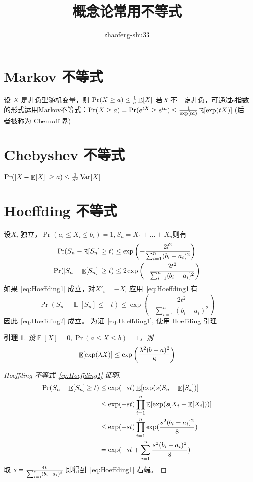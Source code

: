 \documentclass{article}
\DeclareMathOperator\E{\mathbb{E}}
\DeclareMathOperator\Var{\mathrm{Var}}
\newtheorem{lemma}{引理}
\theoremstyle{definition}
\DeclarePairedDelimiter\abs{\lvert}{\rvert}
\begin{document}
\title{概念论常用不等式}
\author{zhaofeng-shu33}
\maketitle
\section{Markov 不等式}
设 $X$ 是非负型随机变量，则 $\Pr(X\geq a) \leq {1 \over a} \E[X]$
若$X$ 不一定非负，可通过$e$指数的形式运用Markov不等式：$\Pr(X\geq a) = \Pr(e^{tX} \geq e^{ta}) \leq { 1 \over \exp(ta)} \E[\exp(tX)]$
(后者被称为 Chernoff 界)

\section{Chebyshev 不等式}
$\Pr(\abs{X-\E[X]} \geq a) \leq {1 \over a^2} \Var[X]$
\section{Hoeffding 不等式}
设$X_i$ 独立，$\Pr(a_i \leq X_i \leq b_i) = 1, S_n = X_1 + \dots + X_n $则有
\begin{align}
\label{eq:Hoeffding1}\Pr( S_n - \E[S_n] \geq t) & \leq \exp \left( - \frac{2t^2}{\sum_{i=1}^n (b_i - a_i)^2} \right) \\
\label{eq:Hoeffding2}\Pr( \abs{S_n - \E[S_n] } \geq t) & \leq 2\exp \left( - \frac{2t^2}{\sum_{i=1}^n (b_i - a_i)^2} \right)
\end{align}
如果~\eqref{eq:Hoeffding1} 成立，对$X'_i= -X_i$ 应用~\eqref{eq:Hoeffding1}有
$$\Pr( S_n - \E[S_n]  \leq -t )  \leq \exp \left( - \frac{2t^2}{\sum_{i=1}^n (b_i - a_i)^2} \right)$$
因此~\eqref{eq:Hoeffding2} 成立。
为证~\eqref{eq:Hoeffding1}, 使用 Hoeffding 引理
\begin{lemma}
设$\E[X]=0, \Pr( a \leq X \leq b) = 1 $，则
\begin{equation}
\E[ \exp(\lambda X) ] \leq \exp\left({\lambda^2 (b-a)^2\over 8}\right)
\end{equation}
\end{lemma}
\begin{proof}[Hoeffding 不等式~\eqref{eq:Hoeffding1} 证明]
\begin{align*}
\Pr( S_n - \E[S_n] \geq t) & \leq \exp(-st) \E[\exp(s(S_n - \E[S_n]) ] \\
& \leq \exp(-st) \prod_{i=1}^n \E[\exp(s(X_i -\E[X_i]))] \\
& \leq \exp(-st) \prod_{i=1}^n \exp({s^2 (b_i - a_i)^2 \over 8 } ) \\
& = \exp(-st + \sum_{i=1}^n { s^2 (b_i - a_i)^2 \over 8} ) 
\end{align*}
取 $ s = {4t \over \sum_{i = 1}^n (b_i - a_i)^2}$ 即得到~\eqref{eq:Hoeffding1} 右端。
\end{proof}
\end{document}
